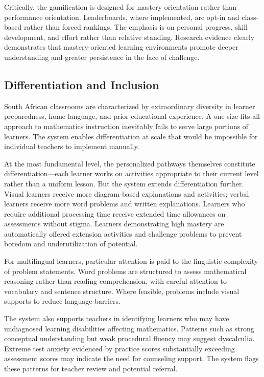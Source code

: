 \documentclass[12pt,a4paper]{article}
\begin{document}
Critically, the gamification is designed for mastery orientation rather than performance orientation. Leaderboards, where implemented, are opt-in and class-based rather than forced rankings. The emphasis is on personal progress, skill development, and effort rather than relative standing. Research evidence clearly demonstrates that mastery-oriented learning environments promote deeper understanding and greater persistence in the face of challenge.

\subsection{Differentiation and Inclusion}

South African classrooms are characterized by extraordinary diversity in learner preparedness, home language, and prior educational experience. A one-size-fits-all approach to mathematics instruction inevitably fails to serve large portions of learners. The system enables differentiation at scale that would be impossible for individual teachers to implement manually.

At the most fundamental level, the personalized pathways themselves constitute differentiation---each learner works on activities appropriate to their current level rather than a uniform lesson. But the system extends differentiation further. Visual learners receive more diagram-based explanations and activities; verbal learners receive more word problems and written explanations. Learners who require additional processing time receive extended time allowances on assessments without stigma. Learners demonstrating high mastery are automatically offered extension activities and challenge problems to prevent boredom and underutilization of potential.

For multilingual learners, particular attention is paid to the linguistic complexity of problem statements. Word problems are structured to assess mathematical reasoning rather than reading comprehension, with careful attention to vocabulary and sentence structure. Where feasible, problems include visual supports to reduce language barriers.

The system also supports teachers in identifying learners who may have undiagnosed learning disabilities affecting mathematics. Patterns such as strong conceptual understanding but weak procedural fluency may suggest dyscalculia. Extreme test anxiety evidenced by practice scores substantially exceeding assessment scores may indicate the need for counseling support. The system flags these patterns for teacher review and potential referral.
\end{document}
